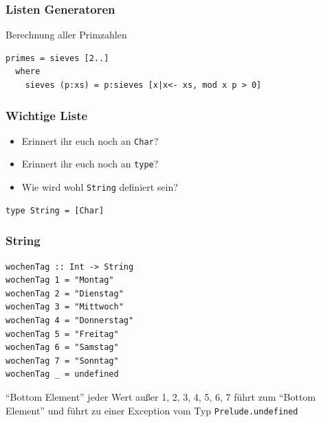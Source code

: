\documentclass[fleqn,11pt,aspectratio=43]{beamer}
\begin{document}
\begin{frame}[fragile]
\frametitle{Listen Generatoren}
\begin{block}{Berechnung aller Primzahlen}
\begin{lstlisting}
primes = sieves [2..]
  where
    sieves (p:xs) = p:sieves [x|x<- xs, mod x p > 0]
\end{lstlisting}
\end{block}
\end{frame}

\begin{frame}[fragile]
\frametitle{Wichtige Liste} 
\begin{block}{\vspace*{-3ex}}
\begin{itemize}
  \item Erinnert ihr euch noch an \lstinline|Char|?
  \item Erinnert ihr euch noch an \lstinline|type|?
  \item Wie wird wohl \lstinline|String| definiert sein?
\end{itemize}
\end{block}
\pause
\begin{lstlisting}
type String = [Char]
\end{lstlisting}
\end{frame}


\begin{frame}[fragile]
\frametitle{String} 
\begin{lstlisting}
wochenTag :: Int -> String
wochenTag 1 = "Montag"
wochenTag 2 = "Dienstag"
wochenTag 3 = "Mittwoch"
wochenTag 4 = "Donnerstag"
wochenTag 5 = "Freitag"
wochenTag 6 = "Samstag"
wochenTag 7 = "Sonntag"
wochenTag _ = undefined
\end{lstlisting}
\begin{alertblock}{"`Bottom Element"'}
jeder Wert außer 1, 2, 3, 4, 5, 6, 7 führt zum "`Bottom Element"' und führt zu einer Exception vom Typ \lstinline|Prelude.undefined|
\end{alertblock}
\end{frame}
\end{document}
